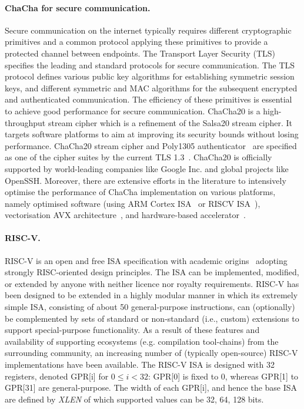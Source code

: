 \paragraph{ChaCha for secure communication.}
Secure communication on the internet typically requires different cryptographic primitives and a common protocol applying these primitives to provide a protected channel between endpoints.
The Transport Layer Security (TLS) specifies the leading and standard protocols for secure communication.
The TLS protocol defines various public key algorithms for establishing symmetric session keys, and different symmetric and MAC algorithms for the subsequent encrypted and authenticated communication.
The efficiency of these primitives is essential to achieve good performance for secure communication.
ChaCha20 is a high-throughput stream cipher which is a refinement of the Salsa20 stream cipher. It targets software platforms to aim at improving its security bounds without losing performance. ChaCha20 stream cipher and Poly1305 authenticator~\cite{RFC:16} are specified as one of the cipher suites by the current TLS 1.3~\cite[Section 9.1]{RFC:18:8446}.
ChaCha20 is officially supported by world-leading companies like Google Inc. and global projects like OpenSSH.
Moreover, there are extensive efforts in the literature to intensively optimise the performance of ChaCha implementation on various platforms, namely optimised software (using ARM Cortex ISA~\cite{SSS:17} or RISCV ISA~\cite{Sto:19}), vectorisation AVX architecture~\cite{GolGue:14}, and hardware-based accelerator~\cite{KLA:19}.  

\paragraph{RISC-V.}
RISC-V is an open and free ISA specification with academic origins~\cite{riscv:14} adopting strongly RISC-oriented design principles. 
The ISA can be implemented, modified, or extended by anyone with neither licence nor royalty requirements.
RISC-V has been designed to be extended in a highly modular manner 
in which its extremely simple ISA, consisting of about 50 general-purpose instructions, can (optionally) be complemented by sets of
standard or non-standard (i.e., custom) extensions to support special-purpose functionality.
As a result of these features and availability of supporting ecosystems (e.g. compilation tool-chains) from the surrounding community,
an increasing number of (typically open-source) RISC-V implementations have been available.
The RISC-V ISA is designed with 32 registers, denoted GPR[i] for $0 \le i < 32$: GPR[0] is fixed to 0, whereas GPR[1] to GPR[31] are general-purpose. 
The width of each GPR[i], and hence the base ISA are defined by \emph{XLEN} of which supported values can be 32, 64, 128 bits. 

